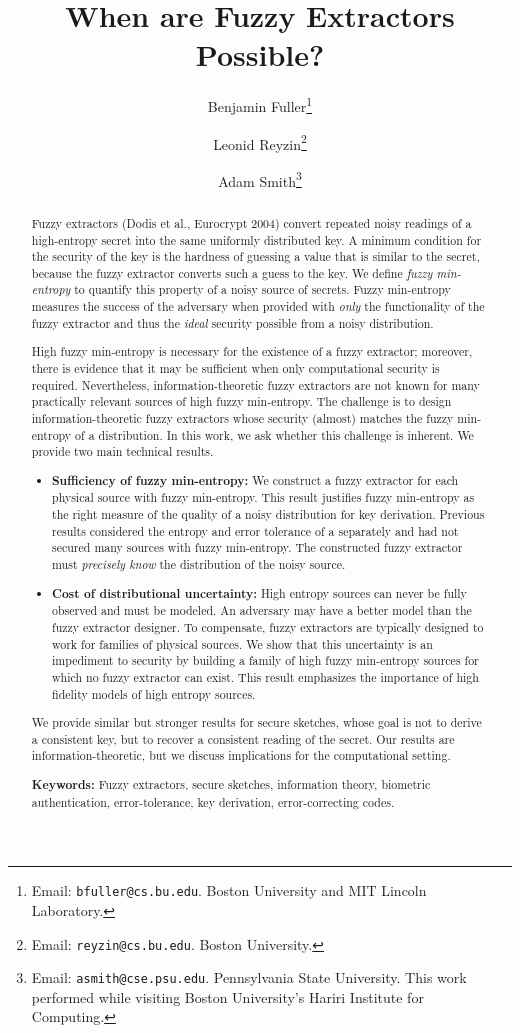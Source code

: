 \documentclass[11pt]{article}
\title{When are Fuzzy Extractors Possible?}
\author{
Benjamin Fuller\footnote{Email: {\tt bfuller@cs.bu.edu}.  Boston
  University and MIT Lincoln Laboratory.}  \and Leonid
Reyzin\footnote{Email: {\tt reyzin@cs.bu.edu}.  Boston University.}
\and Adam Smith\footnote{Email: {\tt asmith@cse.psu.edu}.
  Pennsylvania State University. This work performed while visiting Boston
  University's Hariri Institute for Computing.}}
\begin{document}
\maketitle

\begin{abstract}
Fuzzy extractors (Dodis et al., Eurocrypt 2004) convert repeated noisy readings of a high-entropy secret into the same uniformly distributed key. A minimum condition for the security of the key is the hardness of guessing a value that is similar to the secret, because the fuzzy extractor converts such a guess to the key.
We define \emph{fuzzy min-entropy} to quantify this property of a noisy source of secrets.  Fuzzy min-entropy measures the success of the adversary when provided with \emph{only} the functionality of the fuzzy extractor and thus the \emph{ideal} security possible from a noisy distribution.  

High fuzzy min-entropy is necessary for the existence of a fuzzy extractor; moreover, there is evidence that it may be sufficient when only computational security is required. Nevertheless, information-theoretic fuzzy extractors are not known for many practically relevant sources of high fuzzy min-entropy. The challenge is to design information-theoretic fuzzy extractors whose security (almost) matches the fuzzy min-entropy of a distribution.
In this work, we ask whether this challenge is inherent.
 We provide two main technical results.
\begin{itemize}
\item \textbf{Sufficiency of fuzzy min-entropy:}  We construct a fuzzy extractor for each physical source with fuzzy min-entropy.  This result justifies fuzzy min-entropy as the right measure of the quality of a noisy distribution for key derivation.  Previous results considered the entropy and error tolerance of a separately and had not secured many sources with fuzzy min-entropy.  The constructed fuzzy extractor must \emph{precisely know} the distribution of the noisy source.
\item \textbf{Cost of distributional uncertainty:}  High entropy sources can never be fully observed and must be modeled.  An adversary may have a better model than the fuzzy extractor designer.  To compensate, fuzzy extractors are typically designed to work for families of physical sources. We show that this uncertainty is an impediment to security by building a family of high fuzzy min-entropy sources for which no fuzzy extractor can exist.  This result emphasizes the importance of high fidelity models of high entropy sources.
\end{itemize}
We provide similar but stronger results for secure sketches, whose goal is not to derive a consistent key, but to recover a consistent reading of the secret.  Our results are information-theoretic, but we discuss implications for the computational setting. 

\medskip
\textbf{Keywords:} Fuzzy extractors, secure sketches, information theory, biometric authentication, error-tolerance, key derivation, error-correcting codes.
\end{abstract}
\end{document}

